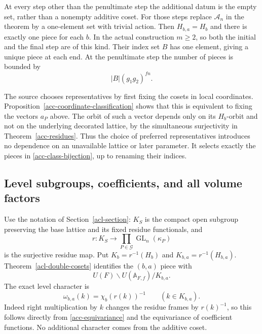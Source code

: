 At every step other than the penultimate step the additional datum is
the empty set, rather than a nonempty additive coset.
For those steps replace $\mathcal A_n$ in the theorem by a one-element
set with trivial action.  Then $H_{b,a}=H_b$ and there is exactly
one piece for each $b$.  In the actual construction $m\geq2$,
so both the initial and the final step are of this kind.
Their index set $B$ has one element, giving a unique piece at each end.
At the penultimate step the number of pieces is bounded by
\[
                            |B|(g_1g_2)^{fn}.
\]

The source chooses representatives by first fixing the cosets in local
coordinates.  Proposition~\ref{acc-coordinate-classification} shows
that this is equivalent to fixing the vectors $a_P$ above.
The orbit of such a vector depends only on its $H_b$-orbit and not on
the underlying decorated lattice, by the simultaneous surjectivity
in Theorem~\ref{acc-residues}.  Thus the choice of preferred
representatives introduces no dependence on an unavailable lattice
or later parameter.  It selects exactly the pieces in
\eqref{acc-class-bijection}, up to renaming their indices.

\subsection{Level subgroups, coefficients, and all volume factors}

Use the notation of Section~\ref{acl-section}:
$K_S$ is the compact open subgroup preserving the base lattice and
its fixed residue functionals, and
\[
 r:K_S\longrightarrow
           \prod_{P\in\mathcal G}\operatorname{GL}_n(\kappa_P)
\]
is the surjective residue map.  Put
$K_{b}=r^{-1}(H_b)$ and $K_{b,a}=r^{-1}(H_{b,a})$.
Theorem~\ref{acl-double-cosets} identifies the $(b,a)$ piece with
\begin{equation}\label{acc-adelic-piece}
                         U(F)\backslash U(\mathbb A_{F,f})/K_{b,a}.
\end{equation}
The exact level character is
\begin{equation}\label{acc-character}
       \omega_{b,a}(k)=\chi_b(r(k))^{-1}
                              \qquad(k\in K_{b,a}).
\end{equation}
Indeed right multiplication by $k$ changes the residue frames by
$r(k)^{-1}$, so this follows directly from
\eqref{acc-equivariance} and the equivariance of coefficient functions.
No additional character comes from the additive coset.

